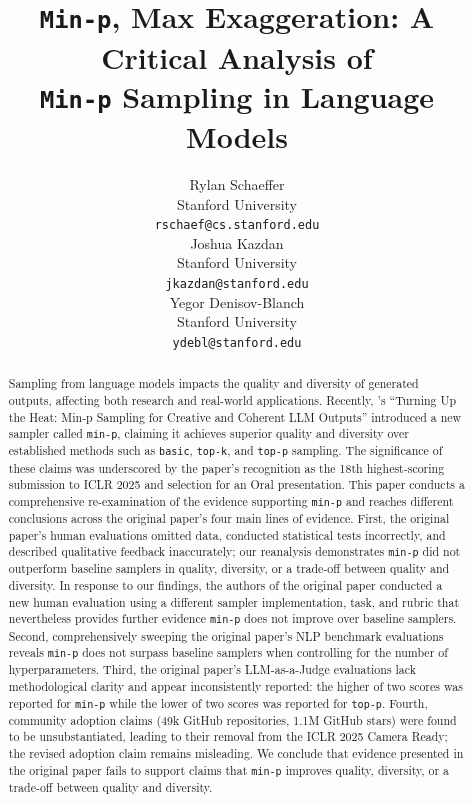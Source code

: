 \documentclass{article}
\title{\texttt{Min-p}, Max Exaggeration: A Critical Analysis of\\\texttt{Min-p} Sampling in Language Models}
\author{%
  Rylan Schaeffer\\
  Stanford University\\
  \texttt{rschaef@cs.stanford.edu}\\
  \And
  Joshua Kazdan\\
  Stanford University \\
  \texttt{jkazdan@stanford.edu} \\
  \And
  Yegor Denisov-Blanch\\
  Stanford University \\
  \texttt{ydebl@stanford.edu} \\
}
\begin{document}
\maketitle


\begin{abstract}
Sampling from language models impacts the quality and diversity of generated outputs, affecting both research and real-world applications.
Recently, \citet{nguyen2024minp}'s ``Turning Up the Heat: Min-p Sampling for Creative and Coherent LLM Outputs'' introduced a new sampler called \texttt{min-p}, claiming it achieves superior quality and diversity over established methods such as \texttt{basic}, \texttt{top-k}, and \texttt{top-p} sampling.
The significance of these claims was underscored by the paper's recognition as the 18th highest-scoring submission to ICLR 2025 and selection for an Oral presentation.
This paper conducts a comprehensive re-examination of the evidence supporting \texttt{min-p} and reaches different conclusions across the original paper's four main lines of evidence.
First, the original paper's human evaluations omitted data, conducted statistical tests incorrectly, and described qualitative feedback inaccurately; our reanalysis demonstrates \texttt{min-p} did not outperform baseline samplers in quality, diversity, or a trade-off between quality and diversity. In response to our findings, the authors of the original paper conducted a new human evaluation using a different sampler implementation, task, and rubric that nevertheless provides further evidence \texttt{min-p} does not improve over baseline samplers.
Second, comprehensively sweeping the original paper's NLP benchmark evaluations reveals \texttt{min-p} does not surpass baseline samplers when controlling for the number of hyperparameters.
Third, the original paper's LLM-as-a-Judge evaluations lack methodological clarity and appear inconsistently reported: the higher of two scores was reported for \texttt{min-p} while the lower of two scores was reported for \texttt{top-p}.
Fourth, community adoption claims (49k GitHub repositories, 1.1M GitHub stars) were found to be unsubstantiated, leading to their removal from the ICLR 2025 Camera Ready; the revised adoption claim remains misleading.
We conclude that evidence presented in the original paper fails to support claims that \texttt{min-p} improves quality, diversity, or a trade-off between quality and diversity.
\end{abstract}








% 
\clearpage





\clearpage

\appendix


\end{document}

